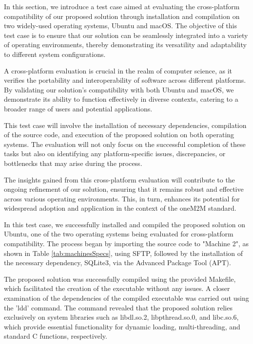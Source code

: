 \documentclass[a4paper,fleqn]{cas-dc}
\begin{document}
In this section, we introduce a test case aimed at evaluating the cross-platform compatibility of our proposed solution through installation and compilation on two widely-used operating systems, Ubuntu and macOS. The objective of this test case is to ensure that our solution can be seamlessly integrated into a variety of operating environments, thereby demonstrating its versatility and adaptability to different system configurations.

A cross-platform evaluation is crucial in the realm of computer science, as it verifies the portability and interoperability of software across different platforms. By validating our solution's compatibility with both Ubuntu and macOS, we demonstrate its ability to function effectively in diverse contexts, catering to a broader range of users and potential applications.

This test case will involve the installation of necessary dependencies, compilation of the source code, and execution of the proposed solution on both operating systems. The evaluation will not only focus on the successful completion of these tasks but also on identifying any platform-specific issues, discrepancies, or bottlenecks that may arise during the process.

The insights gained from this cross-platform evaluation will contribute to the ongoing refinement of our solution, ensuring that it remains robust and effective across various operating environments. This, in turn, enhances its potential for widespread adoption and application in the context of the oneM2M standard.

In this test case, we successfully installed and compiled the proposed solution on Ubuntu, one of the two operating systems being evaluated for cross-platform compatibility. The process began by importing the source code to "Machine 2", as shown in Table \ref{tab:machinesSpecs}, using SFTP, followed by the installation of the necessary dependency, SQLite3, via the Advanced Package Tool (APT).

The proposed solution was successfully compiled using the provided Makefile, which facilitated the creation of the executable without any issues. A closer examination of the dependencies of the compiled executable was carried out using the 'ldd' command. The command revealed that the proposed solution relies exclusively on system libraries such as libdl.so.2, libpthread.so.0, and libc.so.6, which provide essential functionality for dynamic loading, multi-threading, and standard C functions, respectively.
\end{document}
